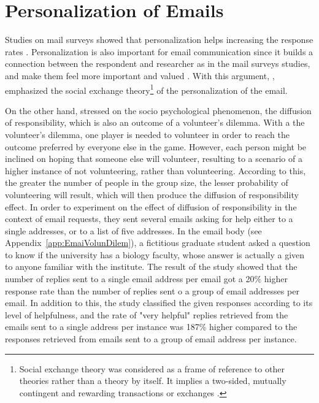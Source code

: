 \section{Personalization of Emails}
\label{sec:2.3:PersEmai}
Studies on mail surveys showed that personalization helps increasing the response rates \citep{Dillman1991,Schaefer1998}. Personalization is also important for email communication since it builds a connection between the respondent and researcher as in the mail surveys studies, and make them feel more important and valued \citep[page 272]{DillmanDonA.SmythJoleneD.Christian2009}. With this argument, \cite{DillmanDonA.SmythJoleneD.Christian2009}, emphasized the social exchange theory\footnote{Social exchange theory was considered as a frame of reference to other theories rather than a theory by itself. It implies a two-sided, mutually contingent and rewarding transactions or exchanges \citep{Emerson1976}.} of the personalization of the email.
\vspace{1cm}

On the other hand, \cite{Barron2002} stressed on the socio psychological phenomenon, the diffusion of responsibility, which is also an outcome of a volunteer's dilemma. With a the volunteer's dilemma, one player is needed to volunteer in order to reach the outcome preferred by everyone else in the game. However, each person might be inclined on hoping that someone else will volunteer, resulting to a scenario of a higher instance of not volunteering, rather than volunteering. According to this, the greater the number of people in the group size, the lesser probability of volunteering will result, which will then produce the diffusion of responsibility effect. In order to experiment on the effect of diffusion of responsibility in the context of email requests, they sent several emails asking for help either to a single addresses, or to a list of five addresses. In the email body (see Appendix~\ref{app:EmaiVolunDilem}), a fictitious graduate student asked a question to know if the university has a biology faculty, whose answer is actually a given to anyone familiar with the institute. The result of the study showed that the number of replies sent to a single email address per email got a 20\% higher response rate than the number of replies sent o a group of email addresses per email. In addition to this, the study classified the given responses according to its level of helpfulness, and the rate of "very helpful" replies retrieved from the emails sent to a single address per instance was 187\% higher compared to the responses retrieved from emails sent to a group of email address per instance.
\vspace{1cm}

